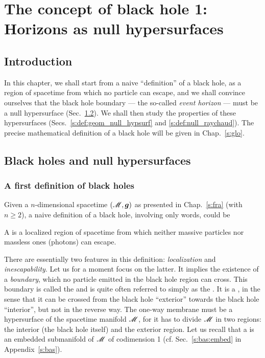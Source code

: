 \chapter{The concept of black hole 1: Horizons as null hypersurfaces}
\label{s:def}

\minitoc

\section{Introduction}

In this chapter, we shall start from a naive ``definition'' of a black hole,
as a region of spacetime from which no particle can escape, and
we shall convince ourselves that the black hole boundary --- the so-called
\emph{event horizon} --- must be a null hypersurface (Sec.~\ref{s:def:BH_null_hypsurf}).
We shall then study the properties of these hypersurfaces
(Secs.~\ref{s:def:geom_null_hypsurf} and \ref{s:def:null_raychaud}).
The precise mathematical definition of a black hole will be given in Chap.~\ref{s:glo}.




\section{Black holes and null hypersurfaces} \label{s:def:BH_null_hypsurf}

\subsection{A first definition of black holes} \label{s:def:first_defin}

Given a $n$-dimensional spacetime $(\mathscr{M},\bm{g})$ as presented in Chap.~\ref{s:fra}
(with $n\geq 2$),
a naive definition of a black hole, involving only words, could be
\begin{greybox}
A  is a localized region of spacetime
from which neither massive particles nor massless ones (photons) can escape.
\end{greybox}
There are essentially two features in this definition: \emph{localization}
and \emph{inescapability}. Let us for a moment focus on the latter.
It implies the existence of a \emph{boundary}, which no
particle emitted in the black hole region can cross.
This boundary is called the
 and is
quite often referred to simply as the .
It is a ,
in the sense that it can be crossed from the black hole ``exterior'' towards
the black hole ``interior'', but not in the reverse way. The one-way membrane must be
a hypersurface of the spacetime manifold $\mathscr{M}$, for it has to divide $\mathscr{M}$ in two regions:
the interior (the black hole itself) and the exterior region.
Let us recall that a  is an
embedded submanifold of $\mathscr{M}$ of codimension 1
(cf. Sec.~\ref{s:bas:embed} in Appendix~\ref{s:bas}).

